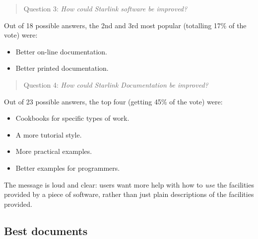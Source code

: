 \begin{quote}
Question 3: {\em How could Starlink software be improved?}
\end{quote}

Out of 18 possible answers, the 2nd and 3rd most popular (totalling 17\%
of the vote) were:
\begin{itemize}
\item Better on-line documentation.
\item Better printed documentation.
\end{itemize}

\begin{quote}
Question 4: {\em How could Starlink Documentation be improved?}
\end{quote}

Out of 23 possible answers, the top four (getting 45\% of the vote) were:
\begin{itemize}
\item Cookbooks for specific types of work.
\item A more tutorial style.
\item More practical examples.
\item Better examples for programmers.
\end{itemize}

The message is loud and clear: users want more help with how to {\em use}
the facilities provided by a piece of software, rather than just plain
descriptions of the facilities provided.

\subsection{\label{BestDocs}Best documents}

